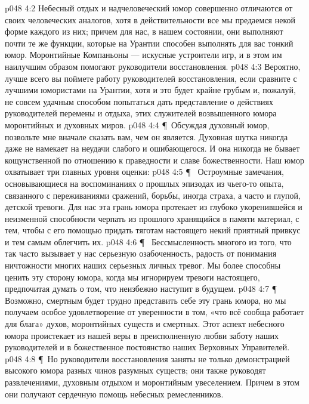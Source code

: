 \vs p048 4:2 Небесный отдых и надчеловеческий юмор совершенно отличаются от своих человеческих аналогов, хотя в действительности все мы предаемся некой форме каждого из них; причем для нас, в нашем состоянии, они выполняют почти те же функции, которые на Урантии способен выполнять для вас тонкий юмор. Моронтийные Компаньоны --- искусные устроители игр, и в этом им наилучшим образом помогают руководители восстановления.
\vs p048 4:3 Вероятно, лучше всего вы поймете работу руководителей восстановления, если сравните с лучшими юмористами на Урантии, хотя и это будет крайне грубым и, пожалуй, не совсем удачным способом попытаться дать представление о действиях руководителей перемены и отдыха, этих служителей возвышенного юмора моронтийных и духовных миров.
\vs p048 4:4 \P\ Обсуждая духовный юмор, позвольте мне вначале сказать вам, чем он  является. Духовная шутка никогда даже не намекает на неудачи слабого и ошибающегося. И она никогда не бывает кощунственной по отношению к праведности и славе божественности. Наш юмор охватывает три главных уровня оценки:
\vs p048 4:5 \P\ \bibnobreakspace {} Остроумные замечания, основывающиеся на воспоминаниях о прошлых эпизодах из чьего\hyp{}то опыта, связанного с переживаниями сражений, борьбы, иногда страха, а часто и глупой, детской тревоги. Для нас эта грань юмора протекает из глубоко укоренившейся и неизменной способности черпать из прошлого хранящийся в памяти материал, с тем, чтобы с его помощью придать тяготам настоящего некий приятный привкус и тем самым облегчить их.
\vs p048 4:6 \P\ \bibnobreakspace {} Бессмысленность многого из того, что так часто вызывает у нас серьезную озабоченность, радость от понимания ничтожности многих наших серьезных личных тревог. Мы более способны ценить эту сторону юмора, когда мы игнорируем тревоги настоящего, предпочитая думать о том, что неизбежно наступит в будущем.
\vs p048 4:7 \P\ \bibnobreakspace {} Возможно, смертным будет трудно представить себе эту грань юмора, но мы получаем особое удовлетворение от уверенности в том, «что всё сообща работает для блага» духов, моронтийных существ и смертных. Этот аспект небесного юмора проистекает из нашей веры в преисполненную любви заботу наших руководителей и в божественное постоянство наших Верховных Управителей.
\vs p048 4:8 \P\ Но руководители восстановления заняты не только демонстрацией высокого юмора разных чинов разумных существ; они также руководят развлечениями, духовным отдыхом и моронтийным увеселением. Причем в этом они получают сердечную помощь небесных ремесленников.
